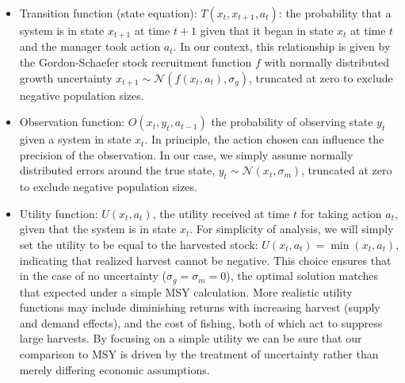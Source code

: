 \documentclass[3p]{elsarticle} %
\begin{document}
\begin{itemize}
\item
  Transition function (state equation): \(T(x_t, x_{t+1}, a_t)\): the
  probability that a system is in state \(x_{t+1}\) at time \(t+1\)
  given that it began in state \(x_t\) at time \(t\) and the manager
  took action \(a_t\). In our context, this relationship is given by the
  Gordon-Schaefer stock recruitment function \(f\) with normally
  distributed growth uncertainty
  \(x_{t+1} \sim \mathcal{N}(f(x_t,a_t), \sigma_g)\), truncated at zero
  to exclude negative population sizes.
\item
  Observation function: \(O(x_t,y_t,a_{t-1})\) the probability of
  observing state \(y_t\) given a system in state \(x_t\). In principle,
  the action chosen can influence the precision of the observation. In
  our case, we simply assume normally distributed errors around the true
  state, \(y_t \sim \mathcal{N}(x_t, \sigma_m)\), truncated at zero to
  exclude negative population sizes.
\item
  Utility function: \(U(x_t,a_t)\), the utility received at time \(t\)
  for taking action \(a_t\), given that the system is in state \(x_t\).
  For simplicity of analysis, we will simply set the utility to be equal
  to the harvested stock: \(U(x_t, a_t) = \min(x_t, a_t)\), indicating
  that realized harvest cannot be negative. This choice ensures that in
  the case of no uncertainty (\(\sigma_g = \sigma_m = 0\)), the optimal
  solution matches that expected under a simple MSY calculation. More
  realistic utility functions may include diminishing returns with
  increasing harvest (supply and demand effects), and the cost of
  fishing, both of which act to suppress large harvests. By focusing on
  a simple utility we can be sure that our comparison to MSY is driven
  by the treatment of uncertainty rather than merely differing economic
  assumptions.
\end{itemize}
\end{document}
